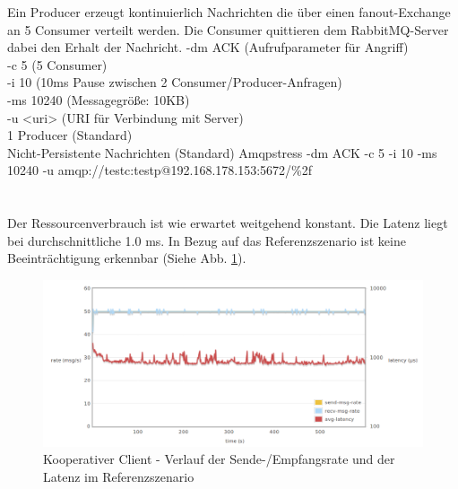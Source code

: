 \documentclass[	a4paper,
			11pt,
			titlepage,
			oneside,
			fleqn,
			listof=totoc,
			parskip,
			numbers=noenddot]{scrartcl}
\begin{document}
		{Ein Producer erzeugt kontinuierlich Nachrichten die über einen \glqq fanout\grqq-Exchange an 5 Consumer verteilt werden. Die Consumer quittieren dem RabbitMQ-Server dabei den Erhalt der Nachricht.}%
		{%
		 -dm ACK (Aufrufparameter für Angriff) \\
		 -c 5 (5 Consumer) \\
		 -i 10 (10ms Pause zwischen 2 Consumer/Producer-Anfragen) \\
		 -ms 10240 (Messagegröße: 10KB) \\
		 -u <uri> (URI für Verbindung mit Server) \\
		 1 Producer (Standard) \\
		 Nicht-Persistente Nachrichten (Standard)
		}%
		{Amqpstress -dm ACK -c 5 -i 10 -ms 10240 -u amqp://testc:testp@192.168.178.153:5672/\%2f}%
		{%
		 \\
		 \\
		 \\
		}%
		{Der Ressourcenverbrauch ist wie erwartet weitgehend konstant. Die Latenz liegt bei durchschnittliche 1.0 ms. In Bezug auf das Referenzszenario ist keine Beeinträchtigung erkennbar  (Siehe Abb. \ref{fig:ack}).}
		
		
		\begin{figure}[!htb]
			\centering
			\includegraphics[width=\textwidth]{img/ack.png}
			\caption{Kooperativer Client - Verlauf der Sende-/Empfangsrate und der Latenz im Referenzszenario}
			\label{fig:ack}
		\end{figure}
\end{document}
